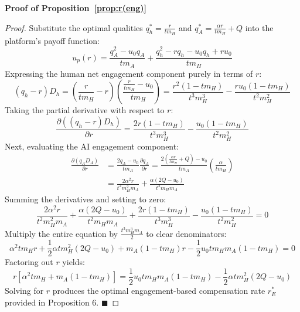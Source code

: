 \documentclass[mnsc,nonblindrev]{informs3_NoOR}
\begin{document}
\noindent\textbf{Proof of Proposition~\ref{prop:r(eng)}}
\begin{proof}
Substitute the optimal qualities $q_{h}^{*} = \frac{r}{tm_{H}}$ and $q_{A}^{*} = \frac{\alpha r}{tm_{H}} + Q$ into the platform's payoff function:
\begin{equation}
u_{p}(r) = \frac{q_{A}^{2} - u_{0}q_{A}}{tm_{A}} + \frac{q_{h}^{2} - rq_{h} - u_{0}q_{h} + ru_{0}}{tm_{H}}
\end{equation}
Expressing the human net engagement component purely in terms of $r$:
\begin{equation}
(q_{h} - r)D_{h} = \left( \frac{r}{tm_{H}} - r \right) \left( \frac{\frac{r}{tm_{H}} - u_{0}}{tm_{H}} \right) = \frac{r^{2}(1 - tm_{H})}{t^{3}m_{H}^{3}} - \frac{ru_{0}(1 - tm_{H})}{t^{2}m_{H}^{2}}
\end{equation}
Taking the partial derivative with respect to $r$:
\begin{equation}
\frac{\partial ((q_{h} - r)D_{h})}{\partial r} = \frac{2r(1 - tm_{H})}{t^{3}m_{H}^{3}} - \frac{u_{0}(1 - tm_{H})}{t^{2}m_{H}^{2}}
\end{equation}
Next, evaluating the AI engagement component:
\begin{align}
\frac{\partial (q_{A}D_{A})}{\partial r} &= \frac{2q_{A} - u_{0}}{tm_{A}} \frac{\partial q_{A}}{\partial r} = \frac{2\left(\frac{\alpha r}{tm_{H}} + Q\right) - u_{0}}{tm_{A}} \left( \frac{\alpha}{tm_{H}} \right) \nonumber \\
&= \frac{2\alpha^{2}r}{t^{2}m_{H}^{2}m_{A}} + \frac{\alpha(2Q - u_{0})}{t^{2}m_{H}m_{A}}
\end{align}
Summing the derivatives and setting to zero:
\begin{equation}
\frac{2\alpha^{2}r}{t^{2}m_{H}^{2}m_{A}} + \frac{\alpha(2Q - u_{0})}{t^{2}m_{H}m_{A}} + \frac{2r(1 - tm_{H})}{t^{3}m_{H}^{3}} - \frac{u_{0}(1 - tm_{H})}{t^{2}m_{H}^{2}} = 0
\end{equation}
Multiply the entire equation by $\frac{t^{3}m_{H}^{3}m_{A}}{2}$ to clear denominators:
\begin{equation}
\alpha^{2}tm_{H}r + \frac{1}{2}\alpha tm_{H}^{2}(2Q - u_{0}) + m_{A}(1 - tm_{H})r - \frac{1}{2}u_{0}tm_{H}m_{A}(1 - tm_{H}) = 0
\end{equation}
Factoring out $r$ yields:
\begin{equation}
r \left[ \alpha^{2}tm_{H} + m_{A}(1 - tm_{H}) \right] = \frac{1}{2}u_{0}tm_{H}m_{A}(1 - tm_{H}) - \frac{1}{2}\alpha tm_{H}^{2}(2Q - u_{0})
\end{equation}
Solving for $r$ produces the optimal engagement-based compensation rate $r_{E}^{*}$ provided in Proposition 6. 
\hfill $\blacksquare$
\end{proof}
\end{document}
